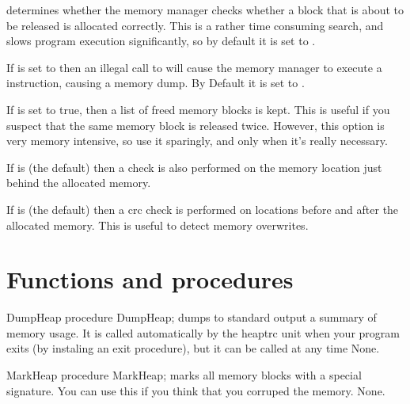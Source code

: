  determines whether the memory manager checks whether a 
block that is about to be released is allocated correctly. This is a rather
time consuming search, and slows program execution significantly, so by
default it is set to .

If  is set to  then an illegal call to 
 will cause the memory manager to execute a  
instruction, causing a memory dump. By Default it is set to .

If  is set to true, then a list of freed memory 
blocks is kept. This is useful if you suspect that the same memory block is
released twice. However, this option is very memory intensive, so use it
sparingly, and only when it's really necessary.

If  is  (the default) then a check is also
performed on the memory location just behind the allocated memory. 

If  is  (the default) then a crc check is performed
on locations before and after the allocated memory. This is useful to
detect memory overwrites.

\section{Functions and procedures}

\begin{procedure}{DumpHeap}
\Declaration 
procedure DumpHeap;
\Description
{} dumps to standard output a summary of memory usage.
It is called automatically by the heaptrc unit when your program exits
(by instaling an exit procedure), but it can be called at any time
\Errors
None.
\SeeAlso
{}
\end{procedure}

\begin{procedure}{MarkHeap}
\Declaration
procedure MarkHeap;
\Description
{} marks all memory blocks with a special signature.
You can use this if you think that you corruped the memory.
\Errors
None.
\SeeAlso
{}
\end{procedure}

